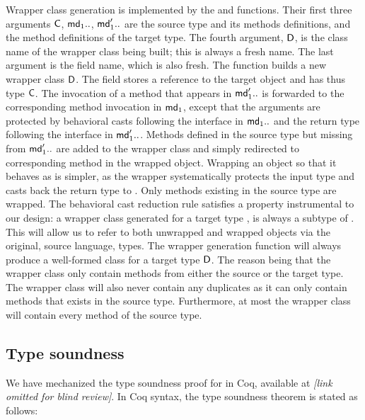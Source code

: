 \documentclass[acmsmall, anonymous, authordraft, review]{acmart} %
\begin{document}
Wrapper class generation is implemented by the  and 
functions. Their first three arguments \(\C\), \(\md[1]..\), \(\mdp[1]..\)
are the source type and its methods definitions, and the method definitions
of the target type. The fourth argument, \(\D\), is the class name of the
wrapper class being built; this is always a fresh name. The last argument is
the \that field name, which is also fresh.  The function builds a new
wrapper class \(\D\).  The field \that stores a reference to the target
object and has thus type \(\C\).  The invocation of a method that appears in
\(\mdp[1]..\) is forwarded to the corresponding method invocation in
\(\md[1]\), except that the arguments are protected by behavioral casts
following the interface in \(\md[1]..\) and the return type following the
interface in \(\mdp[1]..\).  Methods defined in the source type but missing
from \(\mdp[1]..\) are added to the wrapper class and simply redirected to
corresponding method in the wrapped object.  Wrapping an object so that it
behaves as \any is simpler, as the wrapper systematically protects the input
type and casts back the return type to \any. Only methods existing in the
source type are wrapped. The behavioral cast reduction rule satisfies a
property instrumental to our design: a wrapper class generated for a target
type \D, is always a subtype of \D.  This will allow us to refer to both
unwrapped and wrapped objects via the original, source language, types. The
wrapper generation function will always produce a well-formed class for a
target type $\D$. The reason being that the wrapper class only contain
methods from either the source or the target type. The wrapper class will
also never contain any duplicates as it can only contain methods that exists
in the source type.  Furthermore, at most the wrapper class will contain
every method of the source type.

\newpage

\subsection{Type soundness} 
We have mechanized the type soundness proof for \kafka in Coq, 
available at \emph{[link omitted for blind review]}. In Coq syntax, the
\kafka type soundness theorem is stated as follows:
\end{document}
